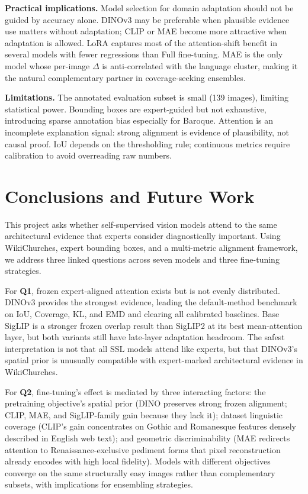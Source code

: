 \documentclass[lineno,pdflatex,sn-mathphys-num]{sn-jnl}%
\theoremstyle{thmstyleone}%
\theoremstyle{thmstyletwo}%
\theoremstyle{thmstylethree}%
\begin{document}
\textbf{Practical implications.} Model selection for domain adaptation should
not be guided by accuracy alone. DINOv3 may be preferable when plausible
evidence use matters without adaptation; CLIP or MAE become more attractive when
adaptation is allowed. LoRA captures most of the attention-shift benefit in
several models with fewer regressions than Full fine-tuning. MAE is the only
model whose per-image $\Delta$ is anti-correlated with the language cluster,
making it the natural complementary partner in coverage-seeking ensembles.

\textbf{Limitations.} The annotated evaluation subset is small (139 images),
limiting statistical power. Bounding boxes are expert-guided but not exhaustive,
introducing sparse annotation bias especially for Baroque. Attention is an
incomplete explanation signal: strong alignment is evidence of plausibility, not
causal proof. IoU depends on the thresholding rule; continuous metrics require
calibration to avoid overreading raw numbers.

\section{Conclusions and Future Work}
\label{sec:conc}

This project asks whether self-supervised vision models attend to the same
architectural evidence that experts consider diagnostically important. Using
WikiChurches, expert bounding boxes, and a multi-metric alignment framework, we
address three linked questions across seven models and three fine-tuning
strategies.

For \textbf{Q1}, frozen expert-aligned attention exists but is not evenly
distributed. DINOv3 provides the strongest evidence, leading the default-method
benchmark on IoU, Coverage, KL, and EMD and clearing all calibrated baselines.
Base SigLIP is a stronger frozen overlap result than SigLIP2 at its best
mean-attention layer, but both variants still have late-layer adaptation
headroom. The safest interpretation is not that all SSL models attend like
experts, but that DINOv3's spatial prior is unusually compatible with
expert-marked architectural evidence in WikiChurches.

For \textbf{Q2}, fine-tuning's effect is mediated by three interacting factors:
the pretraining objective's spatial prior (DINO preserves strong frozen
alignment; CLIP, MAE, and SigLIP-family gain because they lack it); dataset
linguistic coverage (CLIP's gain concentrates on Gothic and Romanesque features
densely described in English web text); and geometric discriminability (MAE
redirects attention to Renaissance-exclusive pediment forms that pixel
reconstruction already encodes with high local fidelity). Models with different
objectives converge on the same structurally easy images rather than
complementary subsets, with implications for ensembling strategies.
\end{document}
